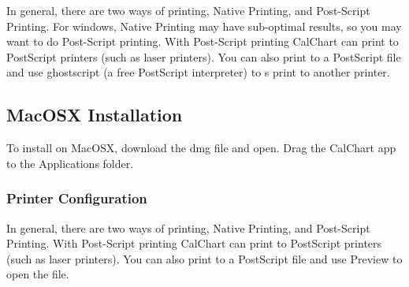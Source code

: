 In general, there are two ways of printing, Native Printing, and Post-Script
Printing.  For windows, Native Printing may have sub-optimal results, so you
may want to do Post-Script printing.  With Post-Script printing CalChart can
print to PostScript printers (such as laser printers).  You can also  print
to a PostScript file and use ghostscript (a free PostScript interpreter) to s
print to another printer.

\subsection{MacOSX Installation}\label{macosxinstall}

To install on MacOSX, download the dmg file and open.  Drag the CalChart app
to the Applications folder.

\subsubsection{Printer Configuration}\label{macosxprinter}

In general, there are two ways of printing, Native Printing, and Post-Script
Printing.  With Post-Script printing CalChart can
print to PostScript printers (such as laser printers).  You can also  print
to a PostScript file and use Preview to open the file.

